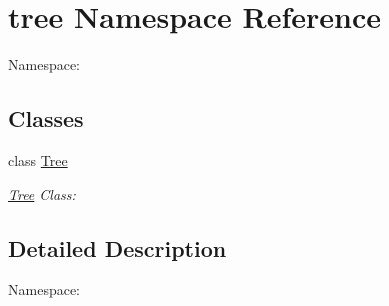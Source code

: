 \hypertarget{namespacetree}{\section{tree Namespace Reference}
\label{namespacetree}
}


Namespace\-:  


\subsection*{Classes}
\begin{DoxyCompactItemize}
\item 
class \hyperlink{classtree_1_1Tree}{Tree}
\begin{DoxyCompactList}\small\item\em \hyperlink{classtree_1_1Tree}{Tree} Class\-: \end{DoxyCompactList}\end{DoxyCompactItemize}


\subsection{Detailed Description}
Namespace\-: 